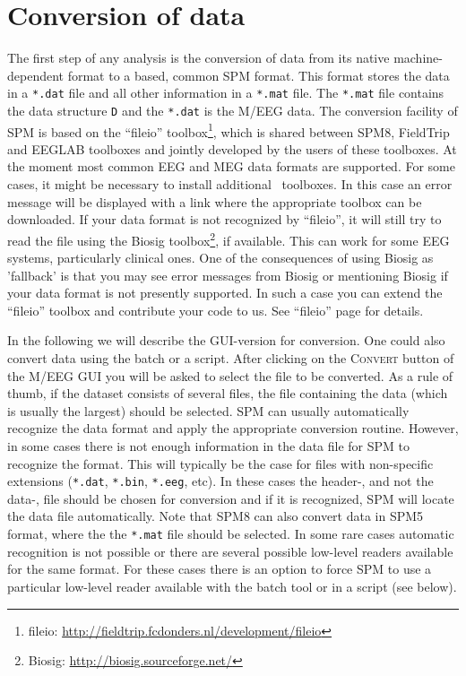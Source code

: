 \section{Conversion of data}
The first step of any analysis is the conversion of data from its native machine-dependent format to a \matlab\-based, common SPM format. This format stores the data in a \texttt{*.dat} file and all other information in a \texttt{*.mat} file. The \texttt{*.mat} file contains the data structure \texttt{D} and the \texttt{*.dat} is the M/EEG data. The conversion facility of SPM is based on the ``fileio'' toolbox\footnote{fileio: \url{http://fieldtrip.fcdonders.nl/development/fileio}}, which is shared between SPM8, FieldTrip and EEGLAB toolboxes and jointly developed by the users of these toolboxes. At the moment most common EEG and MEG data formats are supported. For some cases, it might be necessary to install additional \matlab\ toolboxes. In this case an error message will be displayed with a link where the appropriate toolbox can be downloaded. If your data format is not recognized by ``fileio'', it will still try to read the file using the Biosig toolbox\footnote{Biosig: \url{http://biosig.sourceforge.net/}}, if available. This can work for some EEG systems, particularly clinical ones. One of the consequences of using Biosig as 'fallback' is that you may see error messages from Biosig or mentioning Biosig if your data format is not presently supported. In such a case you can extend the ``fileio'' toolbox and contribute your code to us. See ``fileio'' page for details.

In the following we will describe the GUI-version for conversion. One could also convert data using the batch or a script. After clicking on the \textsc{Convert} button of the M/EEG GUI you will be asked to select the file to be converted. As a rule of thumb, if the dataset consists of several files, the file containing the data (which is usually the largest) should be selected. SPM can usually automatically recognize the data format and apply the appropriate conversion routine. However, in some cases there is not enough information in the data file for SPM to recognize the format. This will typically be the case for files with non-specific extensions (\texttt{*.dat}, \texttt{*.bin}, \texttt{*.eeg}, etc). In these cases the header-, and not the data-, file should be chosen for conversion and if it is recognized, SPM will locate the data file automatically. Note that SPM8 can also convert data in SPM5 format, where the the \texttt{*.mat} file should be selected. In some rare cases automatic recognition is not possible or there are several possible low-level readers available for the same format. For these cases there is an option to force SPM to use a particular low-level reader available with the batch tool or in a script (see below).

